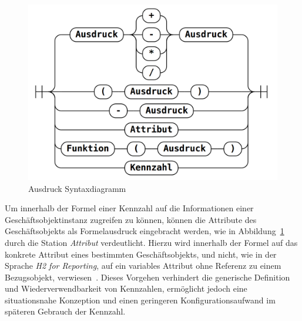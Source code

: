 \documentclass[
  language=german, %
  type=bachelor,%
  ngerman
]{isthesis}
\begin{document}
\begin{content}

  \begin{figure}
    \includegraphics[scale=0.25]{content/figures/railroad-kennzahl.png}
    \caption[Ausdruck Syntaxdiagramm]{Ausdruck Syntaxdiagramm \protect\footnotemark}\label{railroad-kennzahl}
  \end{figure}
	
  Um innerhalb der Formel einer Kennzahl auf die Informationen einer
  Geschäftsobjektinstanz zugreifen zu können, können die Attribute des
  Geschäftsobjekts als Formelausdruck eingebracht werden, wie in
  Abbildung~\ref{railroad-kennzahl} durch die Station \textit{Attribut}
  verdeutlicht. Hierzu wird innerhalb der Formel auf das konkrete Attribut
  eines bestimmten Geschäftsobjekts, und nicht, wie in der Sprache \textit{H2
  for Reporting}, auf ein variables Attribut ohne Referenz zu einem
  Bezugsobjekt, verwiesen~\cite[][S.  20]{becker2007h2}. Dieses Vorgehen
  verhindert die generische Definition und Wiederverwendbarkeit von Kennzahlen,
  ermöglicht jedoch eine situationsnahe Konzeption und einen geringeren
  Konfigurationsaufwand im späteren Gebrauch der Kennzahl.


\end{content}
\end{document}
